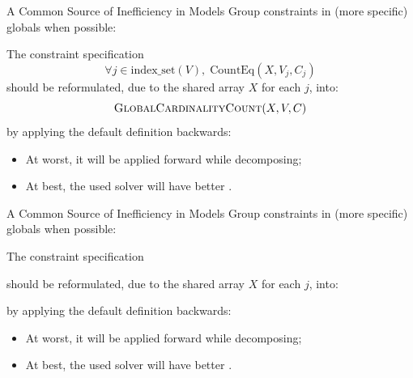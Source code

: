 \documentclass{cons-beamer}
\begin{document}
\begin{frame}{A Common Source of Inefficiency in Models}
  Group constraints in (more specific) globals when possible:
  \begin{example}
    The constraint specification
    \[
    \forall j \in \text{index\_set}(V), \; \text{CountEq}(X, V_j, C_j)
    \]
    should be reformulated, due to the \alert{shared} array $X$ for \alert{each} $j$, into: 
    \[
    \textsc{GlobalCardinalityCount}(X, V, C)
    \]
    by applying the default definition backwards: \vfill
    \begin{itemize}
      \item At worst, it will be applied forward while decomposing;
      \item At best, the used solver will have better .
    \end{itemize}
  \end{example}
\end{frame}

\begin{flashcardcpmpy}
\begin{frame}{A Common Source of Inefficiency in Models}
  Group constraints in (more specific) globals when possible:
  \begin{example}
    The constraint specification
    \begin{center}
    \end{center}\vfill
    should be reformulated, due to the \alert{shared} array $X$ for \alert{each} $j$, into: 
    \begin{center}
    \end{center}\vfill
    by applying the default definition backwards: \vfill
    \begin{itemize}
      \item At worst, it will be applied forward while decomposing;
      \item At best, the used solver will have better .
    \end{itemize}
  \end{example}
\end{frame}
\end{flashcardcpmpy}

    
\subsection{}
\end{document}
